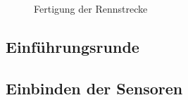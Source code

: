 \documentclass[a4paper,12pt]{article}                                         %
\numberwithin{table}{section}                               %
\numberwithin{figure}{section}                              %
\renewcommand{\thetable}{\arabic{section}.\arabic{table}}   %
\renewcommand{\thefigure}{\arabic{section}.\arabic{figure}} %
\begin{document}
\begin{figure}[h!]
\begin{subfigure}{.5\textwidth}
	  \label{fig:sub2}
	\end{subfigure}
	\vspace{10pt}
	\caption{Fertigung der Rennstrecke}
	\label{fig:gebauteStrecke}
	\end{figure}
	
	\subsection{Einführungsrunde}
	
	\subsection{Einbinden der Sensoren}
		
	\renewcommand{\thetable}{\Alph{section}.\arabic{table}}              %
	\renewcommand{\thefigure}{\Alph{section}.\arabic{figure}}            %
	\renewcommand{\thelstlisting}{\Alph{section}.\arabic{lstlisting}}    %
	
	\begin{appendix}
	\end{appendix}
	
	
	
	
\end{document}
